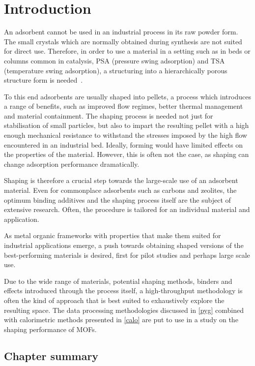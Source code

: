 
\section{Introduction}

An adsorbent cannot be used in an industrial process in its raw powder
form. The small crystals which are normally obtained during synthesis
are not suited for direct use. Therefore, in order to use a 
material in a setting such 
as in beds or columns common in catalysis, PSA (pressure swing 
adsorption) and TSA (temperature swing adsorption), a structuring 
into a hierarchically porous structure form is 
needed~\cite{akhtarStructuringAdsorbentsCatalysts2014}.

To this end adsorbents are usually shaped into pellets, a process
which introduces a range of benefits, such as improved flow regimes,
better thermal management and material containment. The shaping process
is needed not just for stabilisation of small particles, but also to
impart the resulting pellet with a high enough mechanical resistance 
to withstand the stresses imposed by the high flow encountered in 
an industrial bed. Ideally, forming would have limited effects on
the properties of the material. However, this is often not the case, 
as shaping can change adsorption performance dramatically.

Shaping is therefore a crucial step towards the large-scale
use of an adsorbent material. Even for commonplace adsorbents such as
carbons and zeolites, the optimum binding additives and the shaping
process itself are the subject of extensive research. Often, the
procedure is tailored for an individual material and application.

As metal organic frameworks with properties that make them suited 
for industrial applications emerge, a push towards obtaining shaped
versions of the best-performing materials is desired, first for 
pilot studies and perhaps large scale use.

Due to the wide range of materials, potential shaping methods, binders 
and effects introduced through the process itself, a high-throughput
methodology is often the kind of approach that is best suited to 
exhaustively explore the resulting space. The data processing methodologies
discussed in \autoref{pyg} combined with calorimetric methods
presented in \autoref{calo} are put to use in a study on the 
shaping performance of MOFs.

\subsection*{Chapter summary}

